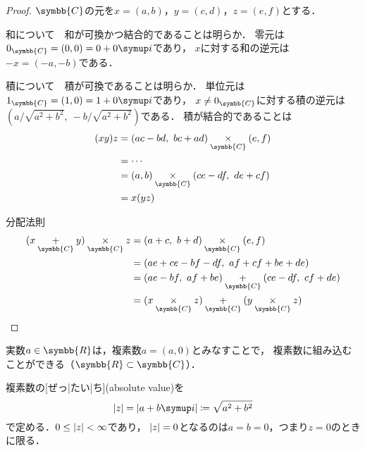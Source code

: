 \documentclass[../sotsu.tex]{subfiles}
\begin{document}
\begin{proof}
    $\symbb{C}$の元を$x = (a, b)$，$y = (c, d)$，$z = (e, f)$とする．

    \textsf{和について}　和が可換かつ結合的であることは明らか．
    零元は$0_{\symbb{C}} = (0, 0) = 0 + 0\iu$であり，
    $x$に対する和の逆元は$-x = (-a, -b)$である．

    \textsf{積について}　積が可換であることは明らか．
    単位元は$1_{\symbb{C}} = (1, 0) = 1 + 0\iu$であり，
    $x \neq 0_{\symbb{C}}$に対する積の逆元は$(a / \sqrt{a^2 + b^2}, \  -b / \sqrt{a^2 + b^2} )$である．
    積が結合的であることは
    \begin{equation*}
        \begin{split}
            (xy)z &= (ac-bd, \  bc+ad) \underset{\symbb{C}}{\times} (e, f)   \\
                  &= \cdots  \\
                  &= (a, b) \underset{\symbb{C}}{\times} (ce-df, \  de+cf)   \\
                  &= x(yz)
        \end{split}
    \end{equation*}

    \textsf{分配法則}　
    \begin{equation*}
        \begin{split}
            (x \underset{\symbb{C}}{+} y) \underset{\symbb{C}}{\times} z
            &= (a+c, \  b+d) \underset{\symbb{C}}{\times} (e, f)   \\ 
            &= (ae+ce-bf-df, \  af+cf+be+de)   \\
            &= (ae-bf, \  af+be) \underset{\symbb{C}}{+} (ce-df, \  cf+de)   \\
            &= (x \underset{\symbb{C}}{\times} z) \underset{\symbb{C}}{+}
               (y \underset{\symbb{C}}{\times} z)
        \end{split}
    \end{equation*}
\end{proof}

実数$a \in \symbb{R}$は，複素数$a = (a, 0)$とみなすことで，
複素数に組み込むことができる（$\symbb{R} \subset \symbb{C}$）．

複素数の[ぜっ|たい|ち](absolute value)を
\begin{equation}
    \label{eq:complex-number-abs}
    \abs{z} 
        = \abs{a + b\iu}
        \coloneq \sqrt{a^2 + b^2}
\end{equation}
で定める．$0 \leq \lvert z\rvert < \infty$であり，
$\lvert z\rvert = 0$となるのは$a = b = 0$，つまり$z = 0$のときに限る．
\end{document}
